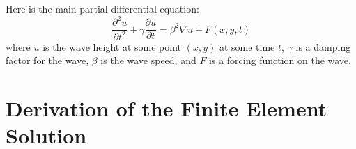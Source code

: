 \documentclass[a4paper,12pt]{article}
\begin{document}
Here is the main partial differential equation:
\[
\frac{\partial^2u}{\partial t^2} + \gamma \frac{\partial u}{\partial t}
=
\beta^2 \nabla u + F(x,y,t)
\]
where $u$ is the wave height at some point $(x,y)$ at some time $t$, $\gamma$ is a damping factor for the wave,
$\beta$ is the wave speed, and $F$ is a forcing function on the wave.

\section{Derivation of the Finite Element Solution}
\end{document}
